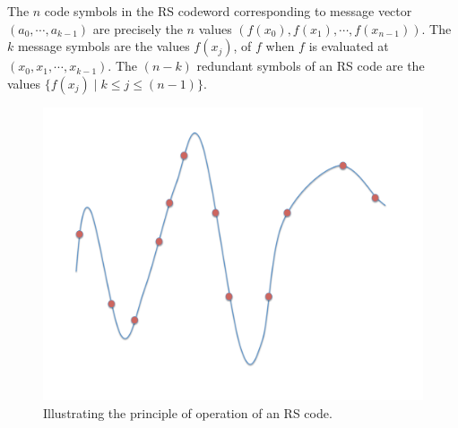 \newpage

\begin{multicols}{2}
The $n$ code symbols in the RS codeword corresponding to message vector $(a_0,\cdots,a_{k-1})$ are precisely the $n$ values $(f(x_0),f(x_1),\cdots,f(x_{n-1}))$.  The $k$ message symbols are the values $f(x_j)$, of $f$ when $f$ is evaluated at $(x_0,x_1,\cdots,x_{k-1})$.  The $(n-k)$ redundant symbols of an RS code are the values $\{ f(x_j) \mid	k \leq j \leq (n-1) \}$. 
		\begin{figure}[H]
			\centering
			\includegraphics[scale=0.28]{src/Figures/chap4/RS_code_idea.pdf} 
			\caption{Illustrating the principle of operation of an RS code.}  \label{fig:RS_code_idea}    
		\end{figure}
	

\end{multicols}
